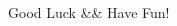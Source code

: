 \documentclass[titlepage, a4paper]{article}
\begin{document}
\begin{multicols}{2}
\begin{spacing}{0.6}
					
		\begin{comment}
				\newpage
			\subsection*{Java Example}
				\inputminted{java}{src/Miscellany/Main2.java}
			\subsection*{Python Example}
				\inputminted{python}{src/Miscellany/test.py}
			\subsection*{Blossom}
				\inputminted{python}{src/TreeandGraph/Blossom.cpp}
			\subsection*{Chu-liu}
				\inputminted{cpp}{src/TreeandGraph/最小树形图.cpp}
			\subsection*{天动万象}
				\inputminted{cpp}{src/yzh/ByteCampA3.cpp}
		\end{comment}
		\end{spacing}
		\endgroup
	\end{multicols}
	\begin{center}
		\LARGE{Good Luck \&\& Have Fun!}
	\end{center}
	
\end{document}
